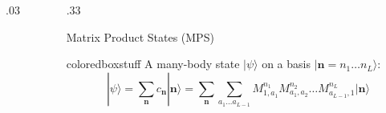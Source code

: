 \documentclass[final, hyperref={pdfpagelabels=false}]{beamer}
\begin{document}
\begin{frame}[t]
\begin{columns}[t]
\begin{column}{.03\textwidth}
\end{column} %

\begin{column}{.33\textwidth} %
\begin{block}{\color{ta2orange!0} Matrix Product States (MPS)}
\begin{beamercolorbox}[wd=\textwidth]{coloredboxstuff}
A many-body state $| \psi \rangle$ on a basis $|\mathbf{n}=n_1\ldots n_L\rangle$:
\begin{equation*}
|\psi \rangle = \sum_\mathbf{n}c_\mathbf{n} |\mathbf{n}\rangle = \sum_\mathbf{n} \!\!\sum_{a_1\ldots a_{L-1}} \!\! M^{n_1}_{1,a_1}M^{n_2}_{a_1,a_2}\ldots M^{n_L}_{a_{L-1},1} |\mathbf{n}\rangle
\end{equation*}


\begin{minipage}{0.96\textwidth}

\centering


\begin{tikzpicture}[x=2pt,y=2pt,yscale=-1,xscale=1]


\end{tikzpicture}
\end{minipage}
\end{beamercolorbox}
\end{block}
\end{column}
\end{columns}
\end{frame}
\end{document}
